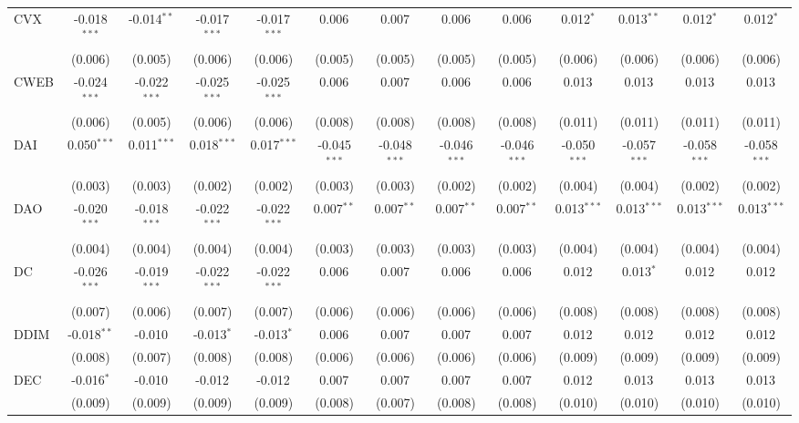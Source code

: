 \begin{table}[!htbp]
\begin{tabular}{@{\extracolsep{5pt}}lcccccccccccc}
 CVX & -0.018$^{***}$ & -0.014$^{**}$ & -0.017$^{***}$ & -0.017$^{***}$ & 0.006$^{}$ & 0.007$^{}$ & 0.006$^{}$ & 0.006$^{}$ & 0.012$^{*}$ & 0.013$^{**}$ & 0.012$^{*}$ & 0.012$^{*}$ \\
  & (0.006) & (0.005) & (0.006) & (0.006) & (0.005) & (0.005) & (0.005) & (0.005) & (0.006) & (0.006) & (0.006) & (0.006) \\
 CWEB & -0.024$^{***}$ & -0.022$^{***}$ & -0.025$^{***}$ & -0.025$^{***}$ & 0.006$^{}$ & 0.007$^{}$ & 0.006$^{}$ & 0.006$^{}$ & 0.013$^{}$ & 0.013$^{}$ & 0.013$^{}$ & 0.013$^{}$ \\
  & (0.006) & (0.005) & (0.006) & (0.006) & (0.008) & (0.008) & (0.008) & (0.008) & (0.011) & (0.011) & (0.011) & (0.011) \\
 DAI & 0.050$^{***}$ & 0.011$^{***}$ & 0.018$^{***}$ & 0.017$^{***}$ & -0.045$^{***}$ & -0.048$^{***}$ & -0.046$^{***}$ & -0.046$^{***}$ & -0.050$^{***}$ & -0.057$^{***}$ & -0.058$^{***}$ & -0.058$^{***}$ \\
  & (0.003) & (0.003) & (0.002) & (0.002) & (0.003) & (0.003) & (0.002) & (0.002) & (0.004) & (0.004) & (0.002) & (0.002) \\
 DAO & -0.020$^{***}$ & -0.018$^{***}$ & -0.022$^{***}$ & -0.022$^{***}$ & 0.007$^{**}$ & 0.007$^{**}$ & 0.007$^{**}$ & 0.007$^{**}$ & 0.013$^{***}$ & 0.013$^{***}$ & 0.013$^{***}$ & 0.013$^{***}$ \\
  & (0.004) & (0.004) & (0.004) & (0.004) & (0.003) & (0.003) & (0.003) & (0.003) & (0.004) & (0.004) & (0.004) & (0.004) \\
 DC & -0.026$^{***}$ & -0.019$^{***}$ & -0.022$^{***}$ & -0.022$^{***}$ & 0.006$^{}$ & 0.007$^{}$ & 0.006$^{}$ & 0.006$^{}$ & 0.012$^{}$ & 0.013$^{*}$ & 0.012$^{}$ & 0.012$^{}$ \\
  & (0.007) & (0.006) & (0.007) & (0.007) & (0.006) & (0.006) & (0.006) & (0.006) & (0.008) & (0.008) & (0.008) & (0.008) \\
 DDIM & -0.018$^{**}$ & -0.010$^{}$ & -0.013$^{*}$ & -0.013$^{*}$ & 0.006$^{}$ & 0.007$^{}$ & 0.007$^{}$ & 0.007$^{}$ & 0.012$^{}$ & 0.012$^{}$ & 0.012$^{}$ & 0.012$^{}$ \\
  & (0.008) & (0.007) & (0.008) & (0.008) & (0.006) & (0.006) & (0.006) & (0.006) & (0.009) & (0.009) & (0.009) & (0.009) \\
 DEC & -0.016$^{*}$ & -0.010$^{}$ & -0.012$^{}$ & -0.012$^{}$ & 0.007$^{}$ & 0.007$^{}$ & 0.007$^{}$ & 0.007$^{}$ & 0.012$^{}$ & 0.013$^{}$ & 0.013$^{}$ & 0.013$^{}$ \\
  & (0.009) & (0.009) & (0.009) & (0.009) & (0.008) & (0.007) & (0.008) & (0.008) & (0.010) & (0.010) & (0.010) & (0.010) \\

\end{tabular}
\end{table}

